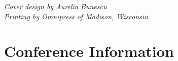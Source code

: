 \documentclass[twoside,makeidx]{book}
\begin{document}

\fancyfoot[C]{}


\clearpage
\thispagestyle{empty}
\vspace*{6in}
\noindent\emph{Cover design by Aurelia Bunescu}\\
\emph{Printing by Omnipress of Madison, Wisconsin}

\fancyfoot[C]{\thepage}
\newpage
\cleardoublepage
\frontmatter


\thispagestyle{empty}
\setheaders{}{}



\setcounter{tocdepth}{2}
\tableofcontents
\mainmatter
\pagestyle{fancy}


\chapter{Conference Information}


\clearpage


\clearpage%
\setheaders{}{}


%
\clearpage%
\setheaders{}{}

%

\clearpage









\end{document}

